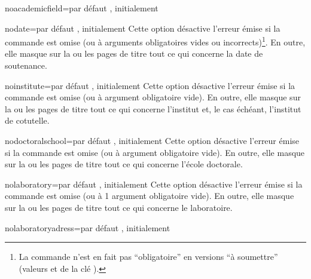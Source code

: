 \begin{description}
\begin{docKey}{noacademicfield}{=\textbar{}}{par
      défaut , initialement }
  \end{docKey}
  \begin{docKey}{nodate}{=\textbar{}}{par défaut
      , initialement }
    Cette option désactive l'erreur émise si la commande  est omise
    (ou à arguments obligatoires vides ou incorrects)\footnote{La commande
       n'est en fait pas \enquote{obligatoire} en versions
      \enquote{à soumettre} (valeurs  et
       de la clé ).}. En outre, elle masque
    sur la ou les pages de titre tout ce qui concerne la date de soutenance.
  \end{docKey}
  \begin{docKey}{noinstitute}{=\textbar{}}{par
      défaut , initialement }
    Cette option désactive l'erreur émise si la commande  est
    omise (ou à argument obligatoire vide). En outre, elle masque sur la ou les
    pages de titre tout ce qui concerne l'institut et, le cas échéant,
    l'institut de cotutelle.
  \end{docKey}
  \begin{docKey}{nodoctoralschool}{=\textbar{}}{par
      défaut , initialement }
    Cette option désactive l'erreur émise si la commande 
    est omise (ou à argument obligatoire vide). En outre, elle masque sur la ou
    les pages de titre tout ce qui concerne l'école doctorale.
  \end{docKey}
  \begin{docKey}{nolaboratory}{=\textbar{}}{par
      défaut , initialement }
    Cette option désactive l'erreur émise si la commande  est
    omise (ou à 1\ier{} argument obligatoire vide). En outre, elle masque sur la
    ou les pages de titre tout ce qui concerne le laboratoire.
  \end{docKey}
  \begin{docKey}{nolaboratoryadress}{=\textbar{}}{par
      défaut , initialement }

\end{docKey}
\end{description}
